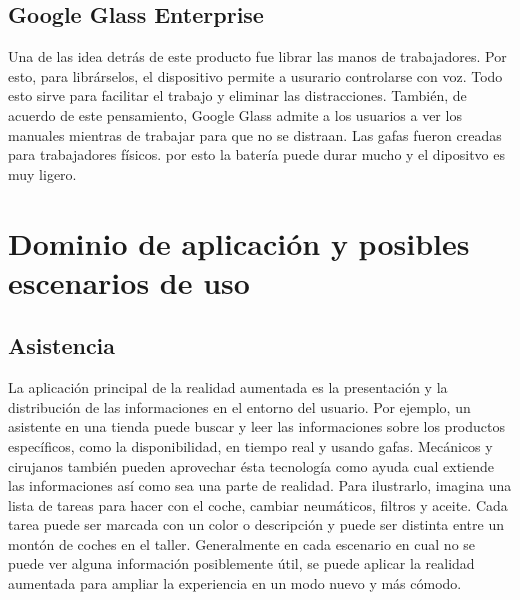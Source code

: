 \documentclass[a4paper,11pt]{scrartcl}
\begin{document}
\subsection{Google Glass Enterprise}
 Una de las idea detrás de este producto fue librar las manos de trabajadores. Por esto, para librárselos, el dispositivo permite a usurario controlarse con voz. Todo esto sirve para facilitar el trabajo y eliminar las distracciones. También, de acuerdo de este pensamiento, Google Glass admite a los usuarios a ver los manuales mientras de trabajar para que no se distraan. Las gafas fueron creadas para trabajadores físicos. por esto la batería puede durar mucho y el dipositvo es muy ligero.


\section{Dominio de aplicación y posibles escenarios de uso} 
\subsection{Asistencia}
La aplicación principal de la realidad aumentada es la presentación y la distribución de las informaciones en el entorno del usuario. Por ejemplo, un asistente en una tienda puede buscar y leer las informaciones sobre los productos específicos, como la disponibilidad, en tiempo real y usando gafas. Mecánicos y cirujanos también pueden aprovechar ésta tecnología como ayuda cual extiende las informaciones así como sea una parte de realidad. Para ilustrarlo, imagina una lista de tareas para hacer con el coche, cambiar neumáticos, filtros y aceite. Cada tarea puede ser marcada con un color o descripción y puede ser distinta entre un montón de coches en el taller. Generalmente en cada escenario en cual no se puede ver alguna información posiblemente útil, se puede aplicar la realidad aumentada para ampliar la experiencia en un modo nuevo y más cómodo.
\end{document}

